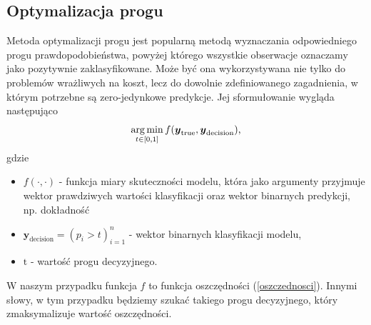\documentclass[inzynierska]{pwr_wmat_praca_dyplomowa}
\theoremstyle{plain}
\numberwithin{theorem}{chapter}
\theoremstyle{definition}
\numberwithin{theorem}{chapter}
\DeclareMathOperator*{\argmin}{arg\,min}
\begin{document}
\subsection{Optymalizacja progu}
Metoda optymalizacji progu jest popularną metodą wyznaczania odpowiedniego progu prawdopodobieństwa, powyżej którego wszystkie obserwacje oznaczamy jako pozytywnie zaklasyfikowane. Może być ona wykorzystywana nie tylko do problemów wrażliwych na koszt, lecz do dowolnie zdefiniowanego zagadnienia, w którym potrzebne są zero-jedynkowe predykcje. Jej sformułowanie wygląda następująco
$$ \argmin_{t \in [0,1]} f(\ytrue, \boldsymbol{y}_{\text{decision}}) \text{,} $$
gdzie 
\begin{itemize}
	\item $f(\cdot, \cdot) $ - funkcja miary skuteczności modelu, która jako argumenty przyjmuje wektor prawdziwych wartości klasyfikacji oraz wektor binarnych predykcji, np. dokładność
	\item $\boldsymbol{y}_{\text{decision}} = (p_i > t)_{i=1}^n $ - wektor binarnych klasyfikacji modelu,
	\item $ \text{t} $ - wartość progu decyzyjnego.
\end{itemize}{}
W naszym przypadku funkcja $f$ to funkcja oszczędności (\ref{oszczednosci}). Innymi słowy, w tym przypadku będziemy szukać takiego progu decyzyjnego, który zmaksymalizuje wartość oszczędności.
\end{document}
